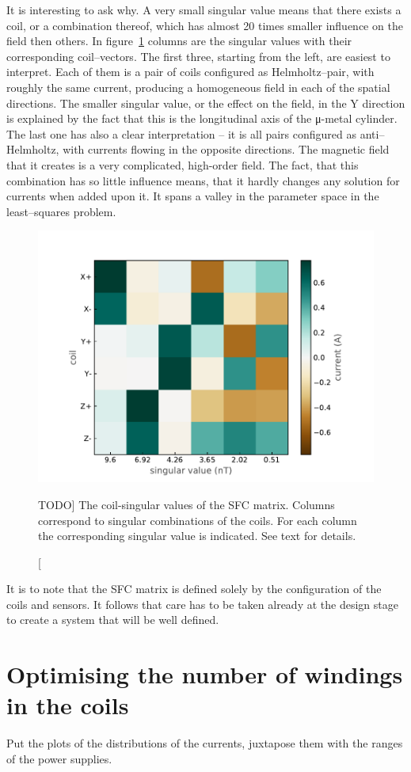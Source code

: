It is interesting to ask why. A very small singular value means that there exists a coil, or a combination thereof, which has almost 20 times smaller influence on the field then others. In figure~\ref{fig:nEDM_SFC_svd} columns are the singular values with their corresponding coil--vectors. The first three, starting from the left, are easiest to interpret. Each of them is a pair of coils configured as Helmholtz--pair, with roughly the same current, producing a homogeneous field in each of the spatial directions. The smaller singular value, or the effect on the field, in the Y direction is explained by the fact that this is the longitudinal axis of the μ-metal cylinder. The last one has also a clear interpretation -- it is all pairs configured as anti--Helmholtz, with currents flowing in the opposite directions. The magnetic field that it creates is a very complicated, high-order field. The fact, that this combination has so little influence means, that it hardly changes any solution for currents when added upon it. It spans a valley in the parameter space in the least--squares problem.

\begin{figure}[bth]
  \myfloatalign
  \includegraphics[width=.7\linewidth]{gfx/nEDM_SFC/coil-singular_vectors_of_the_nEDM_SFC_matrix}
  \caption
  [TODO]
  {The coil-singular values of the SFC matrix. Columns correspond to singular combinations of the coils. For each column the corresponding singular value is indicated. See text for details.}
  \label{fig:nEDM_SFC_svd}
\end{figure}

It is to note that the SFC matrix is defined solely by the configuration of the coils and sensors. It follows that care has to be taken already at the design stage to create a system that will be well defined.


\section{Optimising the number of windings in the coils}
Put the plots of the distributions of the currents, juxtapose them with the
ranges of the power supplies.


